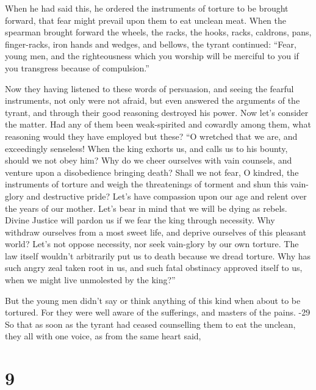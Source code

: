  When he had said this, he ordered the instruments of
torture to be brought forward, that fear might prevail upon them to eat
unclean meat.  When the spearman brought forward the
wheels, the racks, the hooks, racks, caldrons, pans, finger-racks, iron
hands and wedges, and bellows, the tyrant continued: 
``Fear, young men, and the righteousness which you worship will be
merciful to you if you transgress because of compulsion.''

 Now they having listened to these words of persuasion,
and seeing the fearful instruments, not only were not afraid, but even
answered the arguments of the tyrant, and through their good reasoning
destroyed his power.  Now let's consider the matter. Had
any of them been weak-spirited and cowardly among them, what reasoning
would they have employed but these?  ``O wretched that we
are, and exceedingly senseless! When the king exhorts us, and calls us
to his bounty, should we not obey him?  Why do we cheer
ourselves with vain counsels, and venture upon a disobedience bringing
death?  Shall we not fear, O kindred, the instruments of
torture and weigh the threatenings of torment and shun this vain-glory
and destructive pride?  Let's have compassion upon our
age and relent over the years of our mother.  Let's bear
in mind that we will be dying as rebels.  Divine Justice
will pardon us if we fear the king through necessity. 
Why withdraw ourselves from a most sweet life, and deprive ourselves of
this pleasant world?  Let's not oppose necessity, nor
seek vain-glory by our own torture.  The law itself
wouldn't arbitrarily put us to death because we dread torture.
 Why has such angry zeal taken root in us, and such fatal
obstinacy approved itself to us, when we might live unmolested by the
king?''

 But the young men didn't say or think anything of this
kind when about to be tortured.  For they were well aware
of the sufferings, and masters of the pains. -29 So that
as soon as the tyrant had ceased counselling them to eat the unclean,
they all with one voice, as from the same heart said,

\hypertarget{section-8}{%
\section{9}\label{section-8}}

